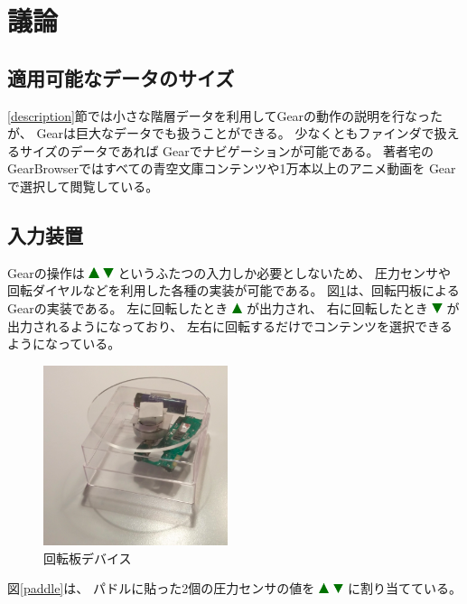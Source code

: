 \documentclass[twoside]{wiss}
\def\GEAR{\textsf{Gear}}
\def\GB{\textsf{GearBrowser}}
\def\up{ \includegraphics[width=3mm,bb=0 0 36 36]{figures/uptriangle.pdf} }
\def\down{ \includegraphics[width=3mm,bb=0 0 36 36]{figures/downtriangle.pdf} }
\begin{document}
\section{議論}

\subsection{適用可能なデータのサイズ}

\ref{description}節では小さな階層データを利用して{\GEAR}の動作の説明を行なったが、
{\GEAR}は巨大なデータでも扱うことができる。
少なくともファインダで扱えるサイズのデータであれば
{\GEAR}でナビゲーションが可能である。
%
著者宅の{\GB}ではすべての青空文庫コンテンツや1万本以上のアニメ動画を
{\GEAR}で選択して閲覧している。


\subsection{入力装置}


{\GEAR}の操作は{\up}{\down}というふたつの入力しか必要としないため、
圧力センサや回転ダイヤルなどを利用した各種の実装が可能である。
%
図\ref{disk}は、回転円板による{\GEAR}の実装である。
左に回転したとき{\up}が出力され、
右に回転したとき{\down}が出力されるようになっており、
左右に回転するだけでコンテンツを選択できるようになっている。

\begin{figure}[H]
\centerline{\includegraphics[width=54mm,bb=0 0 362 354]{figures/ff2d18e66f9a4655dbb5e22e0bb9a0ae.png}}
\caption{回転板デバイス}
\label{disk}
\end{figure}

図\ref{paddle}は、
パドルに貼った2個の圧力センサの値を{\up}{\down}に割り当てている。
\end{document}

